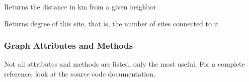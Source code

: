 \documentclass[letterpaper,10pt,english]{sphinxmanual}
\begin{document}
\begin{fulllineitems}

\begin{fulllineitems}
\label{\detokenize{scripting:Site.getDistanceFromNeighbor}}
Returns the distance in km from a given neighbor

\end{fulllineitems}


\begin{fulllineitems}
\label{\detokenize{scripting:Site.getDegree}}
Returns degree of this site, that is, the number of sites connected to it

\end{fulllineitems}


\end{fulllineitems}



\subsubsection{Graph Attributes and Methods}
\label{\detokenize{scripting:graph-attributes-and-methods}}
Not all attributes and methods are listed, only the most useful. For a complete reference, look at the source code documentation.
\end{document}
